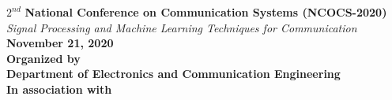 \documentclass[9pt,a4paper,onecolumn,portrait]{article}
\begin{document}
	\begin{center}
		\Large
		{\color[cmyk]{0.88,0,0.94,0.27}$2^{nd}$ \textbf{National Conference on Communication Systems (NCOCS-2020)}}\\\vspace{-0.15cm}
		{\normalsize\textit{\color{blue}Signal Processing and Machine Learning Techniques for Communication}}\\
		{\color{red}\textbf{November 21, 2020}}\\
		\vspace{0.5cm}
		\textbf{\color{blue}Organized by}\\
		{\color{red}\textbf{Department of Electronics and Communication Engineering}}\\
		\vspace{0.5cm}
		\textbf{\color{blue}In association with}\\
		\begin{table}[h!]
			\centering
			\begin{tabular}{cc}

\end{tabular}
\end{table}
\end{center}
\end{document}
